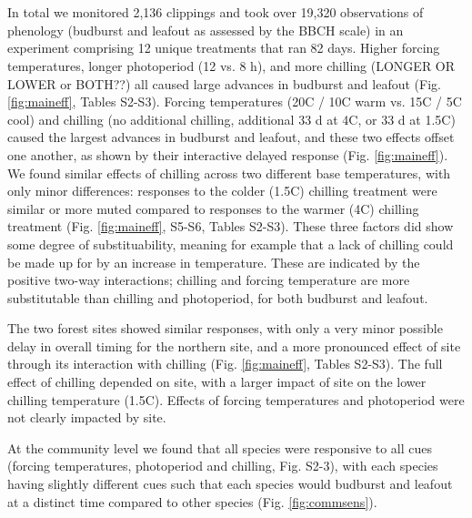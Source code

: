 \documentclass[11pt]{article}
\begin{document}
\vspace{2ex}\\
\vspace{2ex}\\
In total we monitored 2,136 clippings and took over 19,320 observations of phenology (budburst and leafout as assessed by the BBCH scale) in an experiment comprising 12 unique treatments that ran 82 days. Higher forcing temperatures, longer photoperiod (12 vs. 8 h), and more chilling (LONGER OR LOWER or BOTH??) all caused large advances in budburst and leafout (Fig. \ref{fig:maineff}, Tables S2-S3). Forcing temperatures (20\degree C / 10\degree C warm vs. 15\degree C / 5\degree C cool) and chilling (no additional chilling,  additional 33 d at 4\degree C, or 33 d at 1.5\degree C) caused the largest advances in budburst and leafout, and these two effects offset one another, as shown by their interactive delayed response (Fig. \ref{fig:maineff}). We found similar effects of chilling across two different base temperatures, with only minor differences: responses to the colder (1.5\degree C) chilling treatment were similar or more muted compared to responses to the warmer  (4\degree C) chilling treatment (Fig. \ref{fig:maineff}, S5-S6, Tables S2-S3). These three factors did show some degree of substituability, meaning for example that a lack of chilling could be made up for by an increase in temperature. These are indicated by the positive two-way interactions; chilling and forcing temperature are more substitutable than chilling and photoperiod, for both budburst and leafout.

The two forest sites showed similar responses, with only a very minor possible delay in overall timing for the northern site, and a more pronounced effect of site through its interaction with chilling (Fig. \ref{fig:maineff}, Tables S2-S3). The full effect of chilling depended on site, with a larger impact of site on the lower chilling temperature (1.5\degree C). Effects of forcing temperatures and photoperiod were not clearly impacted by site. 

At the community level we found that all species were responsive to all cues (forcing temperatures, photoperiod and chilling, Fig. S2-3), with each species having slightly different cues such that each species would budburst and leafout at a distinct time compared to other species (Fig. \ref{fig:commsens}). 
\end{document}
